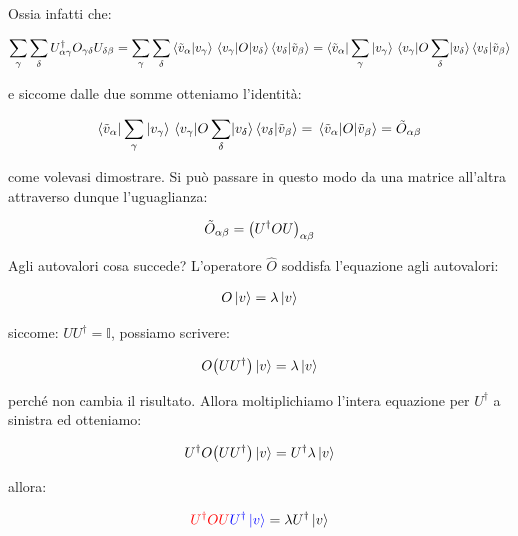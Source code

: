	Ossia infatti che:
	
\begin{align*}
	\sum_{\gamma} \sum_{\delta} U^{\dagger}_{\alpha \gamma} O_{\gamma \delta} U_{\delta \beta} = \sum_{\gamma} \sum_{\delta} \braket{\tilde{v}_{\alpha}}{v_{\gamma}} \mel{v_{\gamma}}{O}{v_{\delta}} \braket{v_{\delta}}{\tilde{v}_{\beta}} =  \bra{\tilde{v}_{\alpha}}\sum_{\gamma} \ket{v_{\gamma}} \mel{ v_{\gamma}}{O \sum_{\delta} }{v_{\delta}} \braket{v_{\delta}}{\tilde{v}_{\beta}} 
\end{align*}

	e siccome dalle due somme otteniamo l'identità:
	
\begin{align*}
	\bra{\tilde{v}_{\alpha}}\sum_{\gamma} \ket{v_{\gamma}} \mel{ v_{\gamma}}{O \sum_{\delta} }{v_{\delta}} \braket{v_{\delta}}{\tilde{v}_{\beta}} = \mel{\tilde{v}_{\alpha}}{O}{\tilde{v}_{\beta}} = \tilde{O}_{\alpha \beta}
\end{align*}

	come volevasi dimostrare. Si può passare in questo modo da una matrice all'altra attraverso dunque l'uguaglianza:

\begin{nb}
\begin{align*}
	\tilde{O}_{\alpha \beta} =  \qty(U^{\dagger} O U)_{\alpha \beta}
\end{align*}
\end{nb}

	 Agli autovalori cosa succede? L'operatore $\hat{O}$ soddisfa l'equazione agli autovalori:
	
\begin{align*}
	O \ket{v} = \lambda \ket{v}
\end{align*}

	siccome: $U U^{\dagger} = \mathbb{I}$, possiamo scrivere:
	
\begin{align*}
	O \qty(U U^{\dagger} ) \ket{v} = \lambda \ket{v}
\end{align*}
	
	perché non cambia il risultato. Allora moltiplichiamo l'intera equazione per $U^{\dagger}$ a sinistra ed otteniamo:

\begin{align*}
	U^{\dagger} O \qty(U U^{\dagger} ) \ket{v} = U^{\dagger} \lambda \ket{v}
\end{align*}
	
	allora:
	
\begin{align*}
	\textcolor{red}{U^{\dagger} O U} \textcolor{blue}{U^{\dagger} \ket{v}} =  \lambda U^{\dagger}  \ket{v}
\end{align*}

